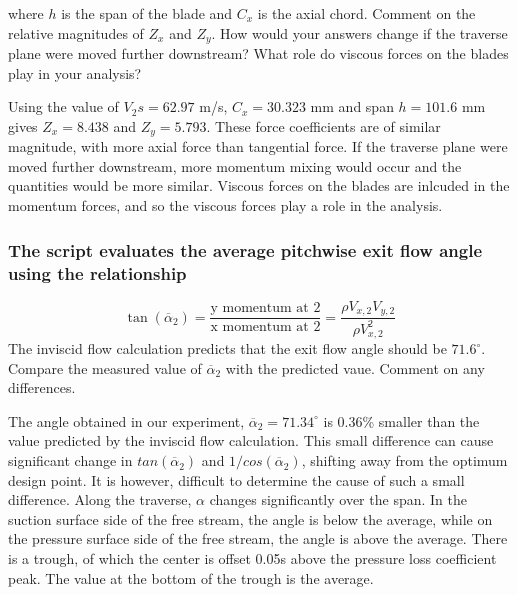 \documentclass{article}
\begin{document}
where $h$ is the span of the blade and $C_x$ is the axial chord. Comment on the relative magnitudes
of $Z_x$ and $Z_y$. How would your answers change if the traverse plane were moved further
downstream? What role do viscous forces on the blades play in your analysis?

Using the value of $V_2s = 62.97$ m/s, $C_x = 30.323$ mm and span $h=101.6$ mm gives $Z_x = 8.438$ and $Z_y = 5.793$.
These force coefficients are of similar magnitude, with more axial force than tangential force.
If the traverse plane were moved further downstream, more momentum mixing would occur and the quantities would be more similar.
Viscous forces on the blades are inlcuded in the momentum forces, and so the viscous forces play a role in the analysis.

\subsubsection{The script evaluates the average pitchwise exit flow angle using the relationship
}
\begin{equation}
    \tan (\overline{\alpha}_2) = \frac{\text{y momentum at 2}}{\text{x momentum at 2}} = \frac{\rho V_{x,2}V_{y,2}}{\rho V_{x,2}^2} \label{eq:alpha2}
\end{equation}
The inviscid flow calculation predicts that the exit flow angle should be $71.6^\circ$. Compare the
measured value of $\overline{\alpha}_2$ with the predicted vaue. Comment on any differences.

The angle obtained in our experiment, $\overline{\alpha}_2 = 71.34^\circ$ is 0.36\% smaller than the value predicted by the inviscid flow calculation.
This small difference can cause significant change in $tan(\overline{\alpha}_2)$ and $1/cos(\overline{\alpha}_2)$, shifting away from the optimum design point.
It is however, difficult to determine the cause of such a small difference.
Along the traverse, $\alpha$ changes significantly over the span. In the suction surface side of the free stream, the angle is below the average, while on the pressure surface side of the free stream, the angle is above the average.
There is a trough, of which the center is offset 0.05s above the pressure loss coefficient peak. The value at the bottom of the trough is the average.

% 
\end{document}
